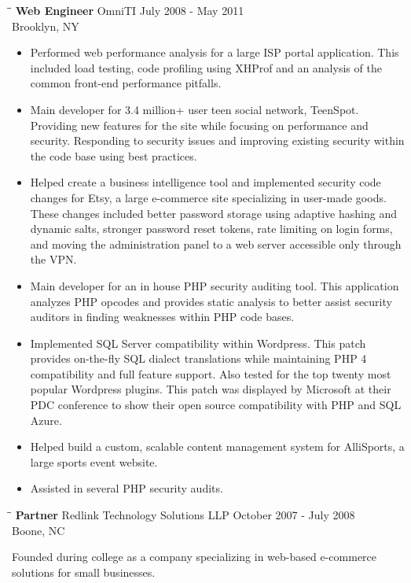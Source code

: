 \documentclass{res}
\begin{document}
\begin{resume}
   \begin{tabbing}%
   \hspace{2.3in}\= \hspace{2.6in}\= \kill %
   {\bf Web Engineer}  \>OmniTI \> July 2008 - May 2011\\
                          \>Brooklyn, NY
   \end{tabbing}\vspace{-5pt}
   \begin{itemize}
    \item Performed web performance analysis for a large ISP portal application. This included load testing, code profiling using XHProf and an analysis of the common front-end performance pitfalls.
    \item Main developer for 3.4 million+ user teen social network, TeenSpot. Providing new features for the site while focusing on performance and security. Responding to security issues and improving existing security within the code base using best practices.
    \item Helped create a business intelligence tool and implemented security code changes for Etsy, a large e-commerce site specializing in user-made goods. These changes included better password storage using adaptive hashing and dynamic salts, stronger password reset tokens, rate limiting on login forms, and moving the administration panel to a web server accessible only through the VPN.
    \item Main developer for an in house PHP security auditing tool. This application analyzes PHP opcodes and provides static analysis to better assist security auditors in finding weaknesses within PHP code bases.
    \item Implemented SQL Server compatibility within Wordpress. This patch provides on-the-fly SQL dialect translations while maintaining PHP 4 compatibility and full feature support. Also tested for the top twenty most popular Wordpress plugins. This patch was displayed by Microsoft at their PDC conference to show their open source compatibility with PHP and SQL Azure.
    \item Helped build a custom, scalable content management system for AlliSports, a large sports event website.
    \item Assisted in several PHP security audits.   
    \end{itemize} 
    
    \begin{tabbing}%
   \hspace{2.3in}\= \hspace{2.6in}\= \kill %
   {\bf Partner}  \>Redlink Technology Solutions LLP \> October 2007 - July 2008\\
                          \>Boone, NC
   \end{tabbing}\vspace{-10pt}
    Founded during college as a company specializing in web-based e-commerce solutions for small businesses. 


\end{resume}
\end{document}
